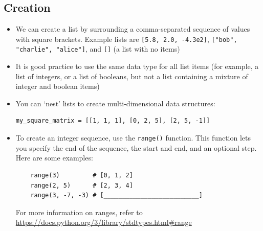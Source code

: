 \documentclass[a4paper,twoside,titlepage]{memoir}
\newcommand{\shellcmd}{\texttt}
\begin{document}
\subsection{Creation}
\begin{itemize}
\item We can create a list by surrounding a comma-separated sequence of values with square brackets.  Example lists are \shellcmd{[5.8, 2.0, -4.3e2]}, \shellcmd{["bob", "charlie", "alice"]}, and \shellcmd{[]} (a list with no items)

\item It is good practice to use the same data type for all list items (for example, a list of integers, or a list of booleans, but not a list containing a mixture of integer and boolean items)

\item You can `nest' lists to create multi-dimensional data structures:
\begin{verbatim}
my_square_matrix = [[1, 1, 1], [0, 2, 5], [2, 5, -1]]
\end{verbatim}

\item \index{range@\shellcmd{range()}} To create an integer sequence, use the \shellcmd{range()} function.  This function lets you specify the end of the sequence, the start and end, and an optional step.  Here are some examples:
\begin{verbatim}
	range(3)         # [0, 1, 2]
	range(2, 5)      # [2, 3, 4]
	range(3, -7, -3) # [__________________________]
\end{verbatim} 
For more information on ranges, refer to \url{https://docs.python.org/3/library/stdtypes.html#range}
\end{itemize}
\end{document}

